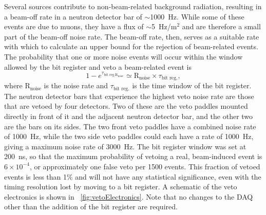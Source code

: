 Several sources contribute to non-beam-related background radiation, resulting in a beam-off rate in a neutron detector bar of $\sim$1000~Hz.  While some of these events are due to muons, they have a flux of $\sim$5~Hz/m$^2$ \citep{PDG} and are therefore a small part of the beam-off noise rate.  The beam-off rate, then, serves as a suitable rate with which to calculate an upper bound for the rejection of beam-related events.  The probability that one or more noise events will occur within the window allowed by the bit register and veto a beam-related event is
\begin{equation}
1 - e^{\tau_{\text{bit reg.}\text{R}_{\text{noise}}}} \simeq \text{R}_{\text{noise}}\times\tau_{\text{bit reg.}},
\end{equation}
where $\text{R}_{\text{noise}}$ is the noise rate and $\tau_{\text{bit reg.}}$ is the time window of the bit register.  The neutron detector bars that experience the highest veto noise rate are those that are vetoed by four detectors.  Two of these are the veto paddles mounted directly in front of it and the adjacent neutron detector bar, and the other two are the bars on its sides.  The two front veto paddles have a combined noise rate of 1000~Hz, while the two side veto paddles could each have a rate of 1000~Hz, giving a maximum noise rate of 3000~Hz.   The bit register window was set at 200~ns, so that the maximum probability of vetoing a real, beam-induced event is $6\times10^{-4}$, or approximately one false veto per 1500 events.  This fraction of vetoed events is less than 1\% and will not have any statistical significance, even with the timing resolution lost by moving to a bit register.  A schematic of the veto electronics is shown in {\fig}~\ref{fig:vetoElectronics}.  Note that no changes to the DAQ other than the addition of the bit register are required.
